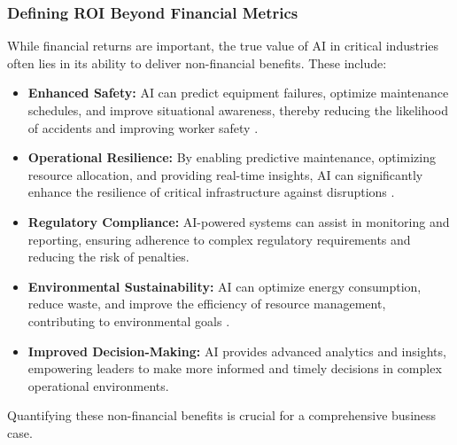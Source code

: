 \subsubsection{Defining ROI Beyond Financial Metrics}
While financial returns are important, the true value of AI in critical industries often lies in its ability to deliver non-financial benefits. These include:
\begin{itemize}
    \item \textbf{Enhanced Safety:} AI can predict equipment failures, optimize maintenance schedules, and improve situational awareness, thereby reducing the likelihood of accidents and improving worker safety \parencite{Chen2019}.
    \item \textbf{Operational Resilience:} By enabling predictive maintenance, optimizing resource allocation, and providing real-time insights, AI can significantly enhance the resilience of critical infrastructure against disruptions \parencite{Davis2020}.
    \item \textbf{Regulatory Compliance:} AI-powered systems can assist in monitoring and reporting, ensuring adherence to complex regulatory requirements and reducing the risk of penalties.
    \item \textbf{Environmental Sustainability:} AI can optimize energy consumption, reduce waste, and improve the efficiency of resource management, contributing to environmental goals \parencite{Wang2021}.
    \item \textbf{Improved Decision-Making:} AI provides advanced analytics and insights, empowering leaders to make more informed and timely decisions in complex operational environments.
\end{itemize}
Quantifying these non-financial benefits is crucial for a comprehensive business case.

